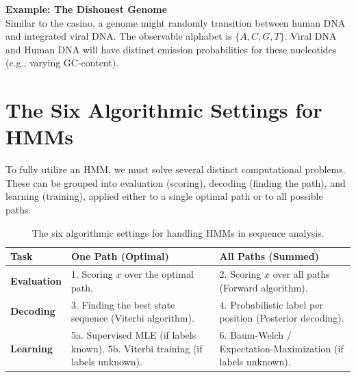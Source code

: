\begin{center}
\end{center}

\textbf{Example: The Dishonest Genome}\\
Similar to the casino, a genome might randomly transition between human DNA and integrated viral DNA. The observable alphabet is $\{A, C, G, T\}$. Viral DNA and Human DNA will have distinct emission probabilities for these nucleotides (e.g., varying GC-content).

\section{The Six Algorithmic Settings for HMMs}

To fully utilize an HMM, we must solve several distinct computational problems. These can be grouped into evaluation (scoring), decoding (finding the path), and learning (training), applied either to a single optimal path or to all possible paths.

\begin{table}[h]
\centering
\begin{tabularx}{\textwidth}{l X X}
\toprule
\textbf{Task} & \textbf{One Path (Optimal)} & \textbf{All Paths (Summed)} \\
\midrule
\textbf{Evaluation} & 1. Scoring $x$ over the optimal path. & 2. Scoring $x$ over all paths (Forward algorithm). \\
\textbf{Decoding} & 3. Finding the best state sequence (Viterbi algorithm). & 4. Probabilistic label per position (Posterior decoding). \\
\textbf{Learning} & 5a. Supervised MLE (if labels known). \newline 5b. Viterbi training (if labels unknown). & 6. Baum-Welch / Expectation-Maximization (if labels unknown). \\
\bottomrule
\end{tabularx}
\caption{The six algorithmic settings for handling HMMs in sequence analysis.}
\end{table}

